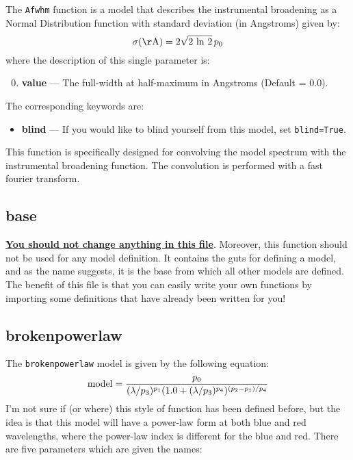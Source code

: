 The \texttt{Afwhm} function is a model that describes the
instrumental broadening as a Normal Distribution function
with standard deviation (in Angstroms) given by:
\begin{equation}
\sigma({\rm \AA})=2\sqrt{2\,\ln\,2}\,p_0
\end{equation}
where the description of this single parameter is:
\begin{enumerate}
\setcounter{enumi}{-1}
\item \textbf{value} --- The full-width at half-maximum in Angstroms (Default = 0.0).
\end{enumerate}
The corresponding keywords are:
\begin{itemize}
\item \textbf{blind} --- If you would like to blind yourself from this model, set \texttt{blind=True}.
\end{itemize}
This function is specifically designed for convolving the
model spectrum with the instrumental broadening function.
The convolution is performed with a fast fourier transform.


\subsection{base}

\textbf{\underline{You should not change anything in this file}}.
Moreover, this function should not be used for any model
definition. It contains the guts for defining a model, and as the
name suggests, it is the base from which all other models are
defined. The benefit of this file is that you can easily write your
own functions by importing some definitions that have already
been written for you!

\subsection{brokenpowerlaw}

The \texttt{brokenpowerlaw} model is given by the following equation:
\begin{equation}
{\rm model}=\frac{p_0}{(\lambda/p_{3})^{p_{1}}(1.0+(\lambda/p_{3})^{p_{4}})^{(p_{2}-p_{1})/p_{4}}}
\end{equation}
I'm not sure if (or where) this style of function has been defined before,
but the idea is that this model will have a power-law form at both blue
and red wavelengths, where the power-law index is different for the
blue and red. There are five parameters which are given
the names:


